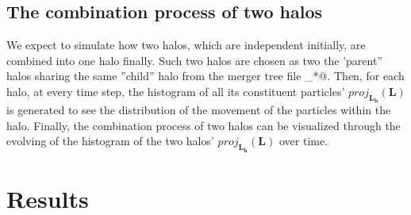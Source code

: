 \documentclass[12pt]{article}
\renewcommand{\vec}[1]{\mathbf{#1}}
\begin{document}
\subsection{The combination process of two halos}
We expect to simulate how two halos, which are independent initially, are combined
into one halo finally. Such two halos are chosen as two the 'parent'' halos sharing 
the same ''child'' halo from the merger tree file \verb@hlist_*@. Then, for 
each halo, at every time step, the histogram of all its constituent particles' 
$proj_{\vec{L_h}}(\vec{L})$ is generated to see the distribution of the movement 
of the particles within the halo. Finally, the combination process of two halos can
be visualized through the evolving of the histogram of the two halos' $proj_{\vec{L_h}}(\vec{L})$
over time.

\section{Results}



\end{document}
